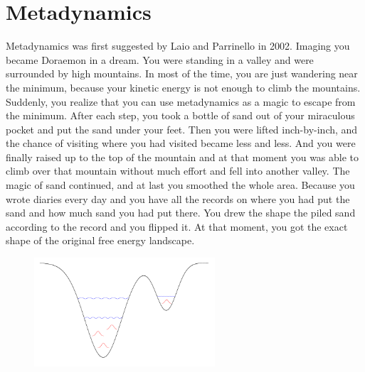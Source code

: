 \section{Metadynamics\label{Sec:ES:metadynamics}}
Metadynamics was first suggested by Laio and Parrinello in 2002.\cite{LaioPNAS2002} Imaging you became Doraemon in a dream. You were standing in a valley and were surrounded by high mountains. In most of the time, you are just wandering near the minimum, because your kinetic energy is not enough to climb the mountains. Suddenly, you realize that you can use metadynamics as a magic to escape from the minimum. After each step, you took a bottle of sand out of your miraculous pocket and put the sand under your feet. Then you were lifted inch-by-inch, and the chance of visiting where you had visited became less and less. And you were finally raised up to the top of the mountain and at that moment you was able to climb over that mountain without much effort and fell into another valley. The magic of sand continued, and at last you smoothed the whole area. Because you wrote diaries every day and you have all the records on where you had put the sand and how much sand you had put there. You drew the shape the piled sand according to the record and you flipped it. At that moment, you got the exact shape of the original free energy landscape. 
\begin{figure}[htbp]
	\centering
	\includegraphics[width=0.6\textwidth]{figures/metadynamics.pdf}\\
	\caption{}\label{Fig:ES:metadynamics}
\end{figure}